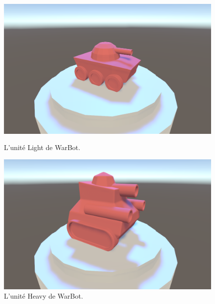 \documentclass{report}
\begin{document}
\begin{figure}[h]
    \begin{minipage}[c]{.46\linewidth}
        \centering
		\includegraphics[scale=0.25]{WarLightImage}
	\caption{L'unité Light de WarBot.}
    \end{minipage}
    \hfill%
    \begin{minipage}[c]{.46\linewidth}
        \centering
		\includegraphics[scale=0.25]{WarHeavyImage}
	\caption{L'unité Heavy de WarBot.}
    \end{minipage}
\end{figure}

\newpage
\end{document}
